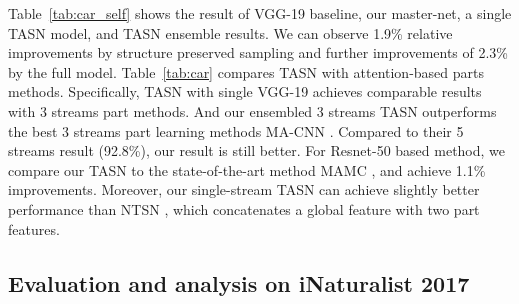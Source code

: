 \documentclass[10pt,twocolumn,letterpaper]{article}
\begin{document}
Table~\ref{tab:car_self} shows the result of VGG-19 baseline, our master-net, a single TASN model, and TASN ensemble results. We can observe 1.9\% relative improvements by structure preserved sampling and further improvements of 2.3\% by the full model. Table~\ref{tab:car} compares TASN with attention-based parts methods. Specifically, TASN with single VGG-19 achieves comparable results with 3 streams part methods. And our ensembled 3 streams TASN outperforms the best 3 streams part learning methods MA-CNN \cite{Zheng_2017_ICCV}. Compared to their 5 streams result (92.8\%), our result is still better. For Resnet-50 based method, we compare our TASN to the state-of-the-art method MAMC \cite{sun2018multi}, and achieve 1.1\% improvements. Moreover, our single-stream TASN can achieve slightly better performance than NTSN \cite{yang2018learning}, which concatenates a global feature with two part features.


\subsection{Evaluation and analysis on iNaturalist 2017}
\label{exp:inat}
\begin{table}
{\small
\caption{Comparison in terms of classification accuracy on the iNaturalist 2017 dataset.}
 \vspace{-3 mm}
\label{tab:inat}
\begin{center}
\end{center}
}
 \vspace{-9 mm}
\end{table}
\end{document}
